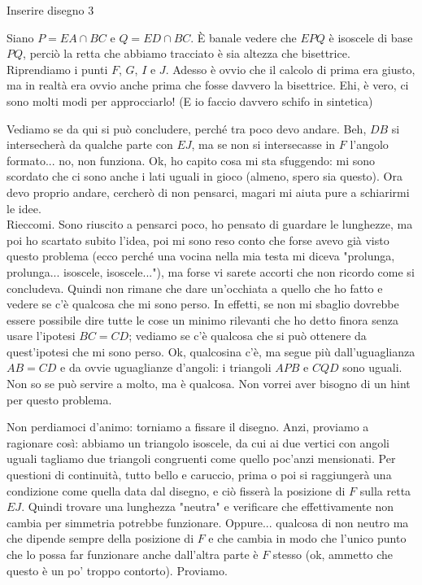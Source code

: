 \begin{sol}
  Inserire disegno 3

  Siano $P=EA \cap BC$ e $Q=ED \cap BC$. È banale vedere che $EPQ$ è isoscele di base $PQ$, perciò la retta che abbiamo tracciato è sia altezza che bisettrice. Riprendiamo i punti $F$, $G$, $I$ e $J$. Adesso è ovvio che il calcolo di prima era giusto, ma in realtà era ovvio anche prima che fosse davvero la bisettrice. Ehi, è vero, ci sono molti modi per approcciarlo! (E io faccio davvero schifo in sintetica)

  Vediamo se da qui si può concludere, perché tra poco devo andare. Beh, $DB$ si intersecherà da qualche parte con $EJ$, ma se non si intersecasse in $F$ l'angolo formato... no, non funziona. Ok, ho capito cosa mi sta sfuggendo: mi sono scordato che ci sono anche i lati uguali in gioco (almeno, spero sia questo). Ora devo proprio andare, cercherò di non pensarci, magari mi aiuta pure a schiarirmi le idee. \\

  Rieccomi. Sono riuscito a pensarci poco, ho pensato di guardare le lunghezze, ma poi ho scartato subito l'idea, poi mi sono reso conto che forse avevo già visto questo problema (ecco perché una vocina nella mia testa mi diceva "prolunga, prolunga... isoscele, isoscele..."), ma forse vi sarete accorti che non ricordo come si concludeva. Quindi non rimane che dare un'occhiata a quello che ho fatto e vedere se c'è qualcosa che mi sono perso. In effetti, se non mi sbaglio dovrebbe essere possibile dire tutte le cose un minimo rilevanti che ho detto finora senza usare l'ipotesi $BC=CD$; vediamo se c'è qualcosa che si può ottenere da quest'ipotesi che mi sono perso. Ok, qualcosina c'è, ma segue più dall'uguaglianza $AB=CD$ e da ovvie uguaglianze d'angoli: i triangoli $APB$ e $CQD$ sono uguali. Non so se può servire a molto, ma è qualcosa. Non vorrei aver bisogno di un hint per questo problema.

  Non perdiamoci d'animo: torniamo a fissare il disegno. Anzi, proviamo a ragionare così: abbiamo un triangolo isoscele, da cui ai due vertici con angoli uguali tagliamo due triangoli congruenti come quello poc'anzi mensionati. Per questioni di continuità, tutto bello e caruccio, prima o poi si raggiungerà una condizione come quella data dal disegno, e ciò fisserà la posizione di $F$ sulla retta $EJ$. Quindi trovare una lunghezza "neutra" e verificare che effettivamente non cambia per simmetria potrebbe funzionare. Oppure... qualcosa di non neutro ma che dipende sempre della posizione di $F$ e che cambia in modo che l'unico punto che lo possa far funzionare anche dall'altra parte è $F$ stesso (ok, ammetto che questo è un po' troppo contorto). Proviamo.


\end{sol}
